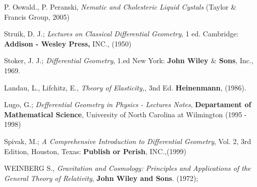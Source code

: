 \begin{thebibliography}{99}
P. Oswald., P. Peranski, \textit{Nematic and Cholesteric Liquid Cystals} (Taylor \& Francis Group, 2005)

 




 Struik, D. J.; \textit{Lectures on Classical Differential Geometry}, 1 ed. Cambridge: \textbf{Addison - Wesley Press,} INC., (1950)

 Stoker, J. J.; \textit{Differential Geometry}, 1.ed New York: \textbf{John Wiley $\&$ Sons}, Inc., 1969.

 Landau, L., Lifchitz, E., \textit{Theory of Elasticity,}, 3nd Ed. \textbf{Heinenmann},  (1986).

 Lugo, G.; \textit{Defferential Geometry in Physics - Lectures Notes}, \textbf{Departament of Mathematical Science}, University of North Carolina at Wilmington (1995 - 1998)

 Spivak, M.; \textit{A Comprehensive Introduction to Differential Geometry}, Vol. 2, 3rd Edition, Houston, Texas: \textbf{Publish or Perish}, INC.,(1999)

 WEINBERG S., \textit{Gravitation and Cosmology: Principles and Applications of the General 
Theory of Relativity}, \textbf{John Wiley and Sons}. (1972); 












\end{thebibliography}
